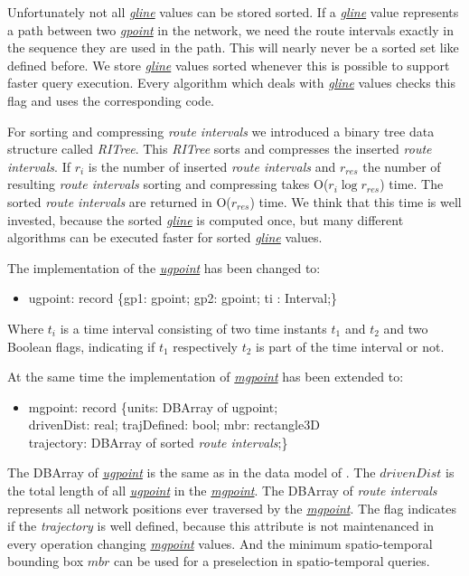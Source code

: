 \documentclass[a4paper]{article}
\newcommand{\dt}[1]{\textsl{\underline{#1}}}
\begin{document}
Unfortunately not all \dt{gline} values can be stored sorted. If a \dt{gline}
value represents a path between two \dt{gpoint} in the network, we need the
route intervals exactly in the sequence they are used in the path. This will
nearly never be a sorted set like defined before.  We store \dt{gline}
values sorted whenever this is possible to support faster query execution.
Every algorithm which deals with \dt{gline} values checks this flag and uses
the corresponding code.

For sorting and compressing \textit{route intervals} we introduced a binary tree
data structure called \textit{RITree}. This \textit{RITree} sorts and compresses the inserted
\textit{route intervals}. If $r_i$ is the number of inserted \textit{route
intervals} and
$r_{res}$ the number of resulting \textit{route intervals} sorting and
compressing takes
O($r_i \log r_{res}$) time. The sorted \textit{route intervals} are returned in
O($r_{res}$) time. We think that this time is well invested, because the sorted
\dt{gline} is computed once, but many different algorithms can be executed
faster
for sorted \dt{gline} values.

The implementation of the \dt{ugpoint} has been changed to:
\begin{ttfamily}
\begin{itemize}
  \item []ugpoint: record \{gp1: gpoint; gp2: gpoint; ti : Interval;\}
\end{itemize}
\end{ttfamily}
Where $t_i$ is a time interval consisting of two time instants $t_1$ and $t_2$
and
two Boolean flags, indicating if $t_1$ respectively $t_2$ is part of the time
interval
or not.

At the same time the implementation of \dt{mgpoint} has been extended to:
\begin{ttfamily}
\begin{itemize}
  \item [] mgpoint: record \{units: DBArray of ugpoint;\\
drivenDist: real; trajDefined: bool; mbr: rectangle3D\\
trajectory: DBArray of sorted \textit{route intervals};\}
\end{itemize}
\end{ttfamily}
The DBArray of \dt{ugpoint} is the same as in the data model of
\cite{NetworkGueting}.
The $drivenDist$ is the total length of all \dt{ugpoint} in the \dt{mgpoint}.
The DBArray of \textit{route intervals} represents all network positions ever
traversed
by the \dt{mgpoint}. The flag indicates if the \textit{trajectory} is well defined,
because this attribute is not maintenanced in every operation changing
\dt{mgpoint} values. And the minimum spatio-temporal bounding box $mbr$ can be
used for a preselection in spatio-temporal queries.
\end{document}
